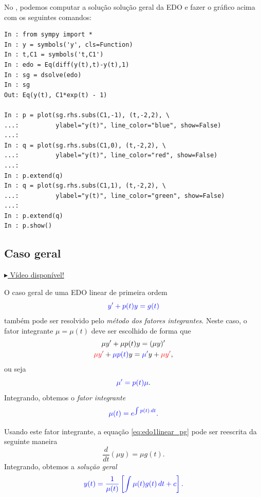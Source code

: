 \begin{ex}
  \ifispython
  No \python, podemos computar a solução solução geral da EDO e fazer o gráfico acima com os seguintes comandos:
\begin{verbatim}
In : from sympy import *
In : y = symbols('y', cls=Function)
In : t,C1 = symbols('t,C1')
In : edo = Eq(diff(y(t),t)-y(t),1)
In : sg = dsolve(edo)
In : sg
Out: Eq(y(t), C1*exp(t) - 1)

In : p = plot(sg.rhs.subs(C1,-1), (t,-2,2), \
...:          ylabel="y(t)", line_color="blue", show=False)
...: 
In : q = plot(sg.rhs.subs(C1,0), (t,-2,2), \
...:          ylabel="y(t)", line_color="red", show=False)
...: 
In : p.extend(q)
In : q = plot(sg.rhs.subs(C1,1), (t,-2,2), \
...:          ylabel="y(t)", line_color="green", show=False)
...: 
In : p.extend(q)
In : p.show()
\end{verbatim}
  \fi
\end{ex}

\subsection{Caso geral}

\begin{flushright}
  \href{https://archive.org/details/edo-ordem-1-linear}{$\blacktriangleright$ Vídeo disponível!}
\end{flushright}

O caso geral de uma EDO linear de primeira ordem
\begin{equation}\label{eq:edo1linear_pg}
  \color{blue}{y' + p(t)y = g(t)}
\end{equation}
também pode ser resolvido pelo \emph{método dos fatores integrantes}. Neste caso, o fator integrante $\mu = \mu(t)$ deve ser escolhido de forma que
\begin{gather}
  \mu y' + \mu p(t)y = (\mu y)'\\
  {\color{red}\mu y'} + {\color{blue}\mu p(t)}y = {\color{blue}\mu'}y + {\color{red}\mu y'},
\end{gather}
ou seja
\begin{equation}
  {\color{blue}\mu' = p(t)\mu}.
\end{equation}
Integrando, obtemos o \emph{fator integrante}
\begin{equation}
  \color{blue}{\mu(t) = e^{\int p(t)\,dt}.}
\end{equation}

Usando este fator integrante, a equação \eqref{eq:edo1linear_pg} pode ser reescrita da seguinte maneira
\begin{equation}
  \frac{d}{dt}\left(\mu y\right) = \mu g(t).
\end{equation}
Integrando, obtemos a \emph{solução geral}
\begin{equation}
  \color{blue}{y(t) = \frac{1}{\mu(t)}\left[\int \mu(t) g(t)\,dt + c\right].}
\end{equation}

